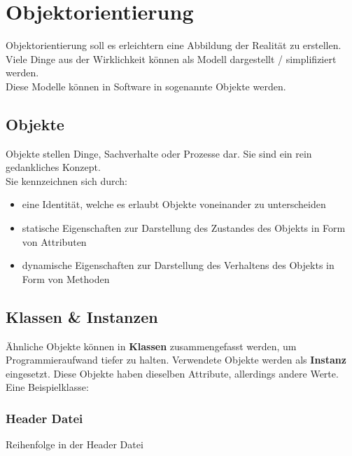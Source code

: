 \section{Objektorientierung}

Objektorientierung soll es erleichtern eine Abbildung der Realität zu erstellen. 
Viele Dinge aus der Wirklichkeit können als Modell dargestellt / simplifiziert werden.\\
Diese Modelle können in Software in sogenannte Objekte  werden.

\subsection{Objekte}

Objekte stellen Dinge, Sachverhalte oder Prozesse dar. Sie sind ein rein gedankliches Konzept.\\
Sie kennzeichnen sich durch:

\begin{itemize}[itemsep=1pt, parsep=0pt]
    \item eine Identität, welche es erlaubt Objekte voneinander zu unterscheiden
    \item statische Eigenschaften zur Darstellung des Zustandes des Objekts in Form von Attributen
    \item dynamische Eigenschaften zur Darstellung des Verhaltens des Objekts in Form von Methoden
\end{itemize}


\subsection{Klassen \& Instanzen}

Ähnliche Objekte können in \textbf{Klassen} zusammengefasst werden, um Programmieraufwand tiefer zu halten. 
Verwendete Objekte werden als \textbf{Instanz} eingesetzt. Diese Objekte haben dieselben Attribute, allerdings andere Werte.\\
Eine Beispielklasse:\\



\subsubsection{Header Datei}

Reihenfolge in der Header Datei

